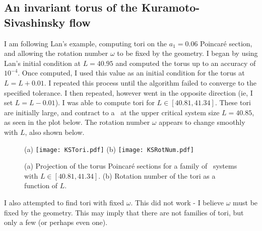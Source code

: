 \subsection{An invariant torus of the Kuramoto-Sivashinsky flow}
\label{sec:KStori}



I am following Lan's example, computing tori on the $a_1=0.06$ Poincar\'e
section, and allowing the rotation number $\omega$ to be fixed by the
geometry.  I began by using Lan's initial condition at $L=40.95$ and
computed the torus up to an accuracy of $10^{-4}$.  Once computed, I used
this value as an initial condition for the torus at $L=L+0.01$.  I
repeated this process until the algorithm failed to converge to the
specified tolerance.  I then repeated, however went in the opposite
direction (ie, I set $L=L-0.01$).  I was able to compute tori for $L\in
[40.81,41.34]$.  These tori are initially large, and contract to a
\po\ at the upper critical system size $L=40.85$, as seen in the plot below.  The rotation number
$\omega$ appears to change smoothly with $L$, also shown below.

\begin{figure}%
\centering
 (a) \texttt{[image: KSTori.pdf]}
 (b) \texttt{[image: KSRotNum.pdf]}
\caption{
(a)
Projection of the torus Poincar\'e sections for a family of
\KS\ systems with $L \in [40.81,41.34]$.
(b)
Rotation number of the tori as a function of $L$.
}
\label{fig:PsecTorus}
\end{figure}

I also attempted to find tori with fixed $\omega$.  This did not work -  I believe $\omega$ must be fixed by the geometry.  This may imply that there are not families of tori, but only a few (or perhaps even one).
